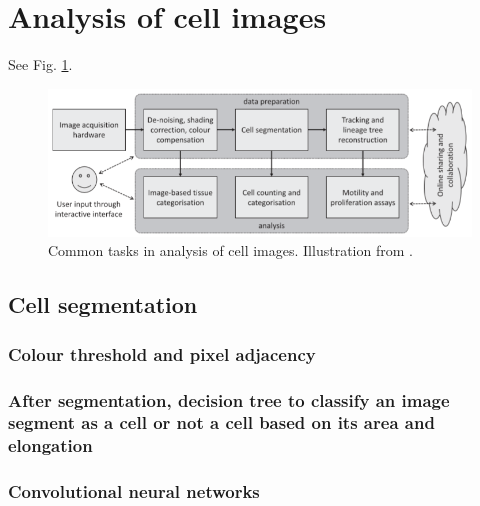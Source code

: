\documentclass[11pt]{article} %
\begin{document}
\section{Analysis of cell images}
See Fig. \ref{fig:cells}.
\begin{figure}[h!]
  \centering
  \includegraphics[width= \linewidth]{cells.png}
  \caption{Common tasks in analysis of cell images. Illustration from \cite{kan:machine}.}
  \label{fig:cells}
\end{figure}
  \subsection{Cell segmentation}
    \subsubsection{Colour threshold and pixel adjacency}
    \subsubsection{After segmentation, decision tree to classify an image segment as a cell or not a cell based on its area and elongation \cite{kan:machine}}
    \subsubsection{Convolutional neural networks}
\end{document}
